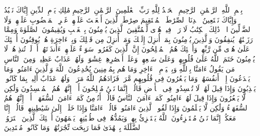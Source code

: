 \startbuffer[\q:1:1]
بِسۡمِ ٱللَّهِ ٱلرَّحۡمَٰنِ ٱلرَّحِیمِ%
\stopbuffer
\startbuffer[\q:1:2]
ٱلۡحَمۡدُ لِلَّهِ رَبِّ ٱلۡعَٰلَمِینَ%
\stopbuffer
\startbuffer[\q:1:3]
ٱلرَّحۡمَٰنِ ٱلرَّحِیمِ%
\stopbuffer
\startbuffer[\q:1:4]
مَٰلِكِ یَوۡمِ ٱلدِّینِ%
\stopbuffer
\startbuffer[\q:1:5]
إِیَّاكَ نَعۡبُدُ وَإِیَّاكَ نَسۡتَعِینُ%
\stopbuffer
\startbuffer[\q:1:6]
ٱهۡدِنَا ٱلصِّرَٰطَ ٱلۡمُسۡتَقِیمَ%
\stopbuffer
\startbuffer[\q:1:7]
صِرَٰطَ ٱلَّذِینَ أَنۡعَمۡتَ عَلَیۡهِمۡ غَیۡرِ ٱلۡمَغۡضُوبِ عَلَیۡهِمۡ وَلَا ٱلضَّاۤلِّینَ%
\stopbuffer
\startbuffer[\q:2:1]
الۤمۤ%
\stopbuffer
\startbuffer[\q:2:2]
ذَٰلِكَ ٱلۡكِتَٰبُ لَا رَیۡبَۛ فِیهِۛ هُدࣰى لِّلۡمُتَّقِینَ%
\stopbuffer
\startbuffer[\q:2:3]
ٱلَّذِینَ یُؤۡمِنُونَ بِٱلۡغَیۡبِ وَیُقِیمُونَ ٱلصَّلَوٰةَ وَمِمَّا رَزَقۡنَٰهُمۡ یُنفِقُونَ%
\stopbuffer
\startbuffer[\q:2:4]
وَٱلَّذِینَ یُؤۡمِنُونَ بِمَاۤ أُنزِلَ إِلَیۡكَ وَمَاۤ أُنزِلَ مِن قَبۡلِكَ وَبِٱلۡءَاخِرَةِ هُمۡ یُوقِنُونَ%
\stopbuffer
\startbuffer[\q:2:5]
أُو۟لَٰۤئِكَ عَلَىٰ هُدࣰى مِّن رَّبِّهِمۡۖ وَأُو۟لَٰۤئِكَ هُمُ ٱلۡمُفۡلِحُونَ%
\stopbuffer
\startbuffer[\q:2:6]
إِنَّ ٱلَّذِینَ كَفَرُوا۟ سَوَاۤءٌ عَلَیۡهِمۡ ءَأَنذَرۡتَهُمۡ أَمۡ لَمۡ تُنذِرۡهُمۡ لَا یُؤۡمِنُونَ%
\stopbuffer
\startbuffer[\q:2:7]
خَتَمَ ٱللَّهُ عَلَىٰ قُلُوبِهِمۡ وَعَلَىٰ سَمۡعِهِمۡۖ وَعَلَىٰۤ أَبۡصَٰرِهِمۡ غِشَٰوَةࣱۖ وَلَهُمۡ عَذَابٌ عَظِیمࣱ%
\stopbuffer
\startbuffer[\q:2:8]
وَمِنَ ٱلنَّاسِ مَن یَقُولُ ءَامَنَّا بِٱللَّهِ وَبِٱلۡیَوۡمِ ٱلۡءَاخِرِ وَمَا هُم بِمُؤۡمِنِینَ%
\stopbuffer
\startbuffer[\q:2:9]
یُخَٰدِعُونَ ٱللَّهَ وَٱلَّذِینَ ءَامَنُوا۟ وَمَا یَخۡدَعُونَ إِلَّاۤ أَنفُسَهُمۡ وَمَا یَشۡعُرُونَ%
\stopbuffer
\startbuffer[\q:2:10]
فِی قُلُوبِهِم مَّرَضࣱ فَزَادَهُمُ ٱللَّهُ مَرَضࣰاۖ وَلَهُمۡ عَذَابٌ أَلِیمُۢ بِمَا كَانُوا۟ یَكۡذِبُونَ%
\stopbuffer
\startbuffer[\q:2:11]
وَإِذَا قِیلَ لَهُمۡ لَا تُفۡسِدُوا۟ فِی ٱلۡأَرۡضِ قَالُوۤا۟ إِنَّمَا نَحۡنُ مُصۡلِحُونَ%
\stopbuffer
\startbuffer[\q:2:12]
أَلَاۤ إِنَّهُمۡ هُمُ ٱلۡمُفۡسِدُونَ وَلَٰكِن لَّا یَشۡعُرُونَ%
\stopbuffer
\startbuffer[\q:2:13]
وَإِذَا قِیلَ لَهُمۡ ءَامِنُوا۟ كَمَاۤ ءَامَنَ ٱلنَّاسُ قَالُوۤا۟ أَنُؤۡمِنُ كَمَاۤ ءَامَنَ ٱلسُّفَهَاۤءُۗ أَلَاۤ إِنَّهُمۡ هُمُ ٱلسُّفَهَاۤءُ وَلَٰكِن لَّا یَعۡلَمُونَ%
\stopbuffer
\startbuffer[\q:2:14]
وَإِذَا لَقُوا۟ ٱلَّذِینَ ءَامَنُوا۟ قَالُوۤا۟ ءَامَنَّا وَإِذَا خَلَوۡا۟ إِلَىٰ شَیَٰطِینِهِمۡ قَالُوۤا۟ إِنَّا مَعَكُمۡ إِنَّمَا نَحۡنُ مُسۡتَهۡزِءُونَ%
\stopbuffer
\startbuffer[\q:2:15]
ٱللَّهُ یَسۡتَهۡزِئُ بِهِمۡ وَیَمُدُّهُمۡ فِی طُغۡیَٰنِهِمۡ یَعۡمَهُونَ%
\stopbuffer
\startbuffer[\q:2:16]
أُو۟لَٰۤئِكَ ٱلَّذِینَ ٱشۡتَرَوُا۟ ٱلضَّلَٰلَةَ بِٱلۡهُدَىٰ فَمَا رَبِحَت تِّجَٰرَتُهُمۡ وَمَا كَانُوا۟ مُهۡتَدِینَ%
\stopbuffer
